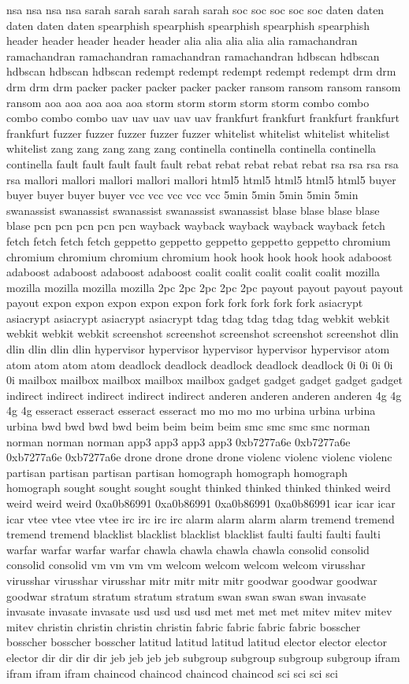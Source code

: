 \documentclass[conference]{IEEEtran}
\begin{document}
nsa nsa nsa nsa sarah sarah sarah sarah sarah soc soc soc soc soc daten daten daten daten daten spearphish spearphish spearphish spearphish spearphish header header header header header alia alia alia alia alia ramachandran ramachandran ramachandran ramachandran ramachandran hdbscan hdbscan hdbscan hdbscan hdbscan redempt redempt redempt redempt redempt drm drm drm drm drm packer packer packer packer packer ransom ransom ransom ransom ransom aoa aoa aoa aoa aoa storm storm storm storm storm combo combo combo combo combo uav uav uav uav uav frankfurt frankfurt frankfurt frankfurt frankfurt fuzzer fuzzer fuzzer fuzzer fuzzer whitelist whitelist whitelist whitelist whitelist zang zang zang zang zang continella continella continella continella continella fault fault fault fault fault rebat rebat rebat rebat rebat rsa rsa rsa rsa rsa mallori mallori mallori mallori mallori html5 html5 html5 html5 html5 buyer buyer buyer buyer buyer vcc vcc vcc vcc vcc 5min 5min 5min 5min 5min swanassist swanassist swanassist swanassist swanassist blase blase blase blase blase pcn pcn pcn pcn pcn wayback wayback wayback wayback wayback fetch fetch fetch fetch fetch geppetto geppetto geppetto geppetto geppetto chromium chromium chromium chromium chromium hook hook hook hook hook adaboost adaboost adaboost adaboost adaboost coalit coalit coalit coalit coalit mozilla mozilla mozilla mozilla mozilla 2pc 2pc 2pc 2pc 2pc payout payout payout payout payout expon expon expon expon expon fork fork fork fork fork asiacrypt asiacrypt asiacrypt asiacrypt asiacrypt tdag tdag tdag tdag tdag webkit webkit webkit webkit webkit screenshot screenshot screenshot screenshot screenshot dlin dlin dlin dlin dlin hypervisor hypervisor hypervisor hypervisor hypervisor atom atom atom atom atom deadlock deadlock deadlock deadlock deadlock 0i 0i 0i 0i 0i mailbox mailbox mailbox mailbox mailbox gadget gadget gadget gadget gadget indirect indirect indirect indirect indirect anderen anderen anderen anderen 4g 4g 4g 4g esseract esseract esseract esseract mo mo mo mo urbina urbina urbina urbina bwd bwd bwd bwd beim beim beim beim smc smc smc smc norman norman norman norman app3 app3 app3 app3 0xb7277a6e 0xb7277a6e 0xb7277a6e 0xb7277a6e drone drone drone drone violenc violenc violenc violenc partisan partisan partisan partisan homograph homograph homograph homograph sought sought sought sought thinked thinked thinked thinked weird weird weird weird 0xa0b86991 0xa0b86991 0xa0b86991 0xa0b86991 icar icar icar icar vtee vtee vtee vtee irc irc irc irc alarm alarm alarm alarm tremend tremend tremend tremend blacklist blacklist blacklist blacklist faulti faulti faulti faulti warfar warfar warfar warfar chawla chawla chawla chawla consolid consolid consolid consolid vm vm vm vm welcom welcom welcom welcom virusshar virusshar virusshar virusshar mitr mitr mitr mitr goodwar goodwar goodwar goodwar stratum stratum stratum stratum swan swan swan swan invasate invasate invasate invasate usd usd usd usd met met met met mitev mitev mitev mitev christin christin christin christin fabric fabric fabric fabric bosscher bosscher bosscher bosscher latitud latitud latitud latitud elector elector elector elector dir dir dir dir jeb jeb jeb jeb subgroup subgroup subgroup subgroup ifram ifram ifram ifram chaincod chaincod chaincod chaincod sci sci sci sci 
\end{document}
